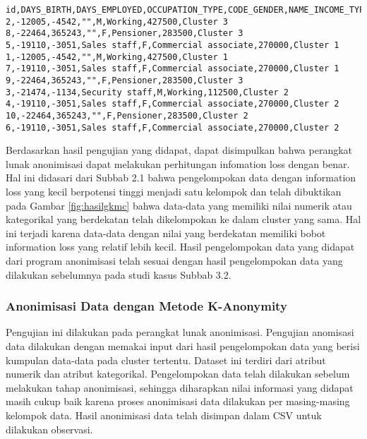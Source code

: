 \begin{lstlisting}[basicstyle=\ttfamily, frame=single,
	columns=fullflexible, keepspaces=true, breaklines=true, label=lst:fungsional_gkmc2, caption=Hasil Pengelompokan Greedy K-Member Clustering]
id,DAYS_BIRTH,DAYS_EMPLOYED,OCCUPATION_TYPE,CODE_GENDER,NAME_INCOME_TYPE,AMT_INCOME_TOTAL,Cluster
2,-12005,-4542,"",M,Working,427500,Cluster 3
8,-22464,365243,"",F,Pensioner,283500,Cluster 3
5,-19110,-3051,Sales staff,F,Commercial associate,270000,Cluster 1
1,-12005,-4542,"",M,Working,427500,Cluster 1
7,-19110,-3051,Sales staff,F,Commercial associate,270000,Cluster 1
9,-22464,365243,"",F,Pensioner,283500,Cluster 3
3,-21474,-1134,Security staff,M,Working,112500,Cluster 2
4,-19110,-3051,Sales staff,F,Commercial associate,270000,Cluster 2
10,-22464,365243,"",F,Pensioner,283500,Cluster 2
6,-19110,-3051,Sales staff,F,Commercial associate,270000,Cluster 2
\end{lstlisting}
\vspace{0.5cm}
Berdasarkan hasil pengujian yang didapat, dapat disimpulkan bahwa perangkat lunak anonimisasi dapat melakukan perhitungan infomation loss dengan benar. Hal ini didasari dari Subbab 2.1 bahwa pengelompokan data dengan information loss yang kecil berpotensi tinggi menjadi satu kelompok dan telah dibuktikan pada Gambar \ref{fig:hasilgkmc} bahwa data-data yang memiliki nilai numerik atau kategorikal yang berdekatan telah dikelompokan ke dalam cluster yang sama. Hal ini terjadi karena data-data dengan nilai yang berdekatan memiliki bobot information loss yang relatif lebih kecil. Hasil pengelompokan data yang didapat dari program anonimisasi telah sesuai dengan hasil pengelompokan data yang dilakukan sebelumnya pada studi kasus Subbab 3.2.


\subsubsection{Anonimisasi Data dengan Metode K-Anonymity}
Pengujian ini dilakukan pada perangkat lunak anonimisasi. Pengujian anomisasi data dilakukan dengan memakai input dari hasil pengelompokan data yang berisi kumpulan data-data pada cluster tertentu. Dataset ini terdiri dari atribut numerik dan atribut kategorikal. Pengelompokan data telah dilakukan sebelum melakukan tahap anonimisasi, sehingga diharapkan nilai informasi yang didapat masih cukup baik karena proses anonimisasi data dilakukan per masing-masing kelompok data. Hasil anonimisasi data telah disimpan dalam CSV untuk dilakukan observasi.


